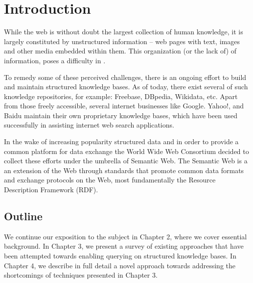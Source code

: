 \chapter{Introduction}

While the web is without doubt the largest collection of human knowledge, it is largely constituted by unstructured information  -- web pages with text, images and other media embedded within them. This organization (or the lack of) of information, poses a difficulty in {\color{red}{TODO}}. 


To remedy some of these perceived challenges, there is an ongoing effort to build and maintain structured knowledge bases. As of today, there exist several of such knowledge repositories, for example: Freebase, DBpedia, Wikidata, etc. Apart from those freely accessible, several internet businesses like Google. Yahoo!, and Baidu maintain their own proprietary knowledge bases, which have been used successfully in assisting internet web search applications.

In the wake of increasing popularity structured data and  in order to provide a common platform for data exchange the World Wide Web Consortium decided to collect these efforts under the umbrella of Semantic Web. The Semantic Web is a an extension of the Web through standards  that promote common data formats and exchange protocols on the Web, most fundamentally the Resource Description Framework (RDF).



\section{Outline}

We continue our exposition to the subject in Chapter 2, where we cover essential background. In Chapter 3, we present a survey of existing approaches that have been attempted towards enabling querying on structured knowledge bases. In Chapter 4, we describe in full detail a novel approach towards addressing the shortcomings of techniques presented in Chapter 3.